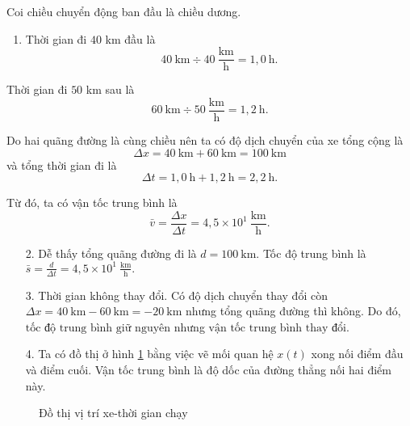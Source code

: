 \documentclass[a4paper, titlepage, openany]{book}
\begin{document}
Coi chiều chuyển động ban đầu là chiều dương.

\begin{enumerate}
   \item Thời gian đi $40$ km đầu là $$40\ \text{km}\div 40\ \frac{\text{km}}{\text{h}}=1,0\ \text{h}.$$
\end{enumerate}

Thời gian đi $50$ km sau là $$60\ \text{km}\div 50\ \frac{\text{km}}{\text{h}}=1,2\ \text{h}.$$

Do hai quãng đường là cùng chiều nên ta có độ dịch chuyển của xe tổng cộng là $$\Delta x=40\ \text{km} + 60\ \text{km} = 100\ \text{km}$$ và tổng thời gian đi là $$\Delta t =1,0\ \text{h}+1,2\ \text{h}=2,2\ \text{h}.$$

Từ đó, ta có vận tốc trung bình là $$\bar{v} = \frac{\Delta x}{\Delta t} =\boxed{4,5\times10^1\ \frac{\text{km}}{\text{h}}}.$$

\begin{enumerate}
   \item[2.] Dễ thấy tổng quãng đường đi là $d=100\ \text{km}$. Tốc độ trung bình là $\bar{s} = \frac{d}{\Delta t}=\boxed{4,5\times10^1\ \frac{\text{km}}{\text{h}}}.$
   \item[3.] Thời gian không thay đổi. Có độ dịch chuyển thay đổi còn $\Delta x = 40\ \text{km} - 60\ \text{km} = -20\ \text{km}$ nhưng tổng quãng đường thì không. Do đó, $\boxed{\text{tốc độ trung bình giữ nguyên}}$ nhưng $\boxed{\text{vận tốc trung bình thay đổi}}$.
   \item[4.] Ta có đồ thị ở hình \ref{fig:do_thi_xe} bằng việc vẽ mối quan hệ $x(t)$ xong nối điểm đầu và điểm cuối. Vận tốc trung bình là độ dốc của đường thẳng nối hai điểm này.
\end{enumerate}

\begin{figure}
   \centering
   \caption{Đồ thị vị trí xe-thời gian chạy}
   \label{fig:do_thi_xe}
\end{figure}
\end{document}
